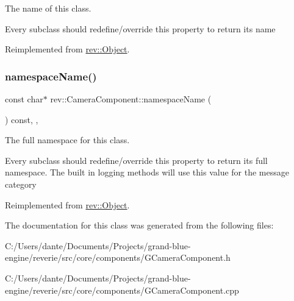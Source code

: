 The name of this class. 

Every subclass should redefine/override this property to return its name 

Reimplemented from \mbox{\hyperlink{classrev_1_1_object_a7a2013f91169479b65cf93afdc5d9a68}{rev\+::\+Object}}.

\mbox{\label{classrev_1_1_camera_component_a9e26b2321133fabca2583eaf5cae00e4}} 
\subsubsection{\texorpdfstring{namespaceName()}{namespaceName()}}
{\footnotesize\ttfamily const char$\ast$ rev\+::\+Camera\+Component\+::namespace\+Name (\begin{DoxyParamCaption}{ }\end{DoxyParamCaption}) const\hspace{0.3cm}{\ttfamily [inline]}, {\ttfamily [override]}, {\ttfamily [virtual]}}



The full namespace for this class. 

Every subclass should redefine/override this property to return its full namespace. The built in logging methods will use this value for the message category 

Reimplemented from \mbox{\hyperlink{classrev_1_1_object_aaeb638d3e10f361c56c211a318a27f3d}{rev\+::\+Object}}.



The documentation for this class was generated from the following files\+:\begin{DoxyCompactItemize}
\item 
C\+:/\+Users/dante/\+Documents/\+Projects/grand-\/blue-\/engine/reverie/src/core/components/G\+Camera\+Component.\+h\item 
C\+:/\+Users/dante/\+Documents/\+Projects/grand-\/blue-\/engine/reverie/src/core/components/G\+Camera\+Component.\+cpp\end{DoxyCompactItemize}
